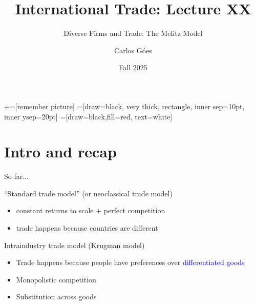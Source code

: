\documentclass[notes,11pt, aspectratio=169, xcolor=table]{beamer}
\title[]{International Trade: Lecture XX}
\subtitle[]{Diverse Firms and Trade: The Melitz Model}
\author[Góes]
{Carlos Góes\inst{1}}
\date{Fall 2025}
\institute[GWU]{\inst{1} George Washington University }
\newcommand{\blue}[1]{\textcolor{blue}{#1}}
\newenvironment{wideitemize}{\itemize\addtolength{\itemsep}{10pt}}{\enditemize}
\begin{document}
\newcommand\marktopleft[1]{%
    \tikz[overlay,remember picture] 
        \node (marker-#1-a) at (-.3em,.3em) {};%
}
\newcommand\markbottomright[2]{%
    \tikz[overlay,remember picture] 
        \node (marker-#1-b) at (0em,0em) {};%
}
+=[remember picture] 
 =[draw=black, very thick, rectangle, inner sep=10pt, inner ysep=20pt]
 =[draw=black,fill=red, text=white]















\frame{\titlepage}
\addtocounter{framenumber}{-1}

\section{Intro and recap}

\begin{frame}{So far...}
\begin{wideitemize}
    \item ``Standard trade model'' (or neoclassical trade model)
        \begin{itemize}
            \item constant returns to scale + perfect competition
            \item trade happens because countries are different
        \end{itemize}
    \item Intraindustry trade model (Krugman model)
    \begin{itemize}
        \item Trade happens because people have preferences over \blue{differentiated goods}
        \item Monopolistic competition
        \item Substitution across goods
    \end{itemize}
\end{wideitemize}
\end{frame}
\end{document}
